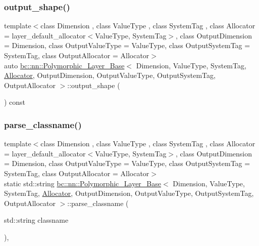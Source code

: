 \subsubsection{\texorpdfstring{output\+\_\+shape()}{output\_shape()}\hspace{0.1cm}{\footnotesize\ttfamily [2/2]}}
{\footnotesize\ttfamily template$<$class Dimension , class Value\+Type , class System\+Tag , class Allocator  = layer\+\_\+default\+\_\+allocator$<$\+Value\+Type, System\+Tag$>$, class Output\+Dimension  = Dimension, class Output\+Value\+Type  = Value\+Type, class Output\+System\+Tag  = System\+Tag, class Output\+Allocator  = Allocator$>$ \\
auto \hyperlink{structbc_1_1nn_1_1Polymorphic__Layer__Base}{bc\+::nn\+::\+Polymorphic\+\_\+\+Layer\+\_\+\+Base}$<$ Dimension, Value\+Type, System\+Tag, \hyperlink{classbc_1_1allocators_1_1Allocator}{Allocator}, Output\+Dimension, Output\+Value\+Type, Output\+System\+Tag, Output\+Allocator $>$\+::output\+\_\+shape (\begin{DoxyParamCaption}{ }\end{DoxyParamCaption}) const\hspace{0.3cm}{\ttfamily [inline]}}

\mbox{\label{structbc_1_1nn_1_1Polymorphic__Layer__Base_ac44549f47e2cac1e9b8e16a2ed2a7d41}} 
\subsubsection{\texorpdfstring{parse\+\_\+classname()}{parse\_classname()}\hspace{0.1cm}{\footnotesize\ttfamily [1/2]}}
{\footnotesize\ttfamily template$<$class Dimension , class Value\+Type , class System\+Tag , class Allocator  = layer\+\_\+default\+\_\+allocator$<$\+Value\+Type, System\+Tag$>$, class Output\+Dimension  = Dimension, class Output\+Value\+Type  = Value\+Type, class Output\+System\+Tag  = System\+Tag, class Output\+Allocator  = Allocator$>$ \\
static std\+::string \hyperlink{structbc_1_1nn_1_1Polymorphic__Layer__Base}{bc\+::nn\+::\+Polymorphic\+\_\+\+Layer\+\_\+\+Base}$<$ Dimension, Value\+Type, System\+Tag, \hyperlink{classbc_1_1allocators_1_1Allocator}{Allocator}, Output\+Dimension, Output\+Value\+Type, Output\+System\+Tag, Output\+Allocator $>$\+::parse\+\_\+classname (\begin{DoxyParamCaption}\item[{std\+::string}]{classname }\end{DoxyParamCaption})\hspace{0.3cm}{\ttfamily [inline]}, {\ttfamily [static]}}

